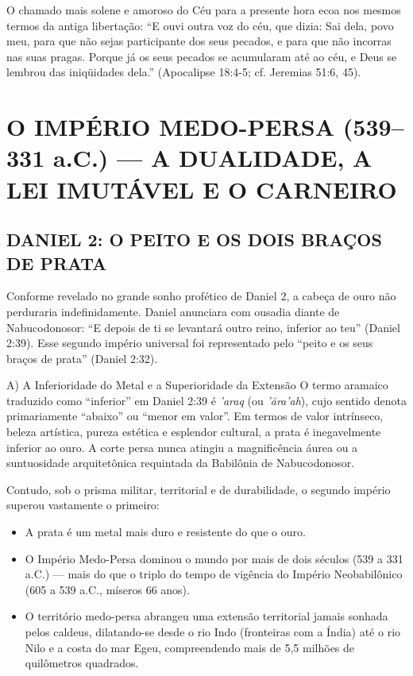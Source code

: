 O chamado mais solene e amoroso do Céu para a presente hora ecoa nos mesmos termos da antiga libertação:
``E ouvi outra voz do céu, que dizia: Sai dela, povo meu, para que não sejas participante dos seus pecados, e para que não incorras nas suas pragas. Porque já os seus pecados se acumularam até ao céu, e Deus se lembrou das iniqüidades dela.'' (Apocalipse 18:4-5; cf. Jeremias 51:6, 45).



\section{O IMPÉRIO MEDO-PERSA (539–331 a.C.) — A DUALIDADE, A LEI IMUTÁVEL E O CARNEIRO}



\subsection{DANIEL 2: O PEITO E OS DOIS BRAÇOS DE PRATA}


Conforme revelado no grande sonho profético de Daniel 2, a cabeça de ouro não perduraria indefinidamente. Daniel anunciara com ousadia diante de Nabucodonosor: ``E depois de ti se levantará outro reino, inferior ao teu'' (Daniel 2:39). Esse segundo império universal foi representado pelo ``peito e os seus braços de prata'' (Daniel 2:32).

A) A Inferioridade do Metal e a Superioridade da Extensão
O termo aramaico traduzido como ``inferior'' em Daniel 2:39 é \textit{'araq} (ou \textit{'ăra'ah}), cujo sentido denota primariamente ``abaixo'' ou ``menor em valor''. Em termos de valor intrínseco, beleza artística, pureza estética e esplendor cultural, a prata é inegavelmente inferior ao ouro. A corte persa nunca atingiu a magnificência áurea ou a suntuosidade arquitetônica requintada da Babilônia de Nabucodonosor.

Contudo, sob o prisma militar, territorial e de durabilidade, o segundo império superou vastamente o primeiro:
\begin{itemize}
  \item A prata é um metal mais duro e resistente do que o ouro.
  \item O Império Medo-Persa dominou o mundo por mais de dois séculos (539 a 331 a.C.) — mais do que o triplo do tempo de vigência do Império Neobabilônico (605 a 539 a.C., míseros 66 anos).
  \item O território medo-persa abrangeu uma extensão territorial jamais sonhada pelos caldeus, dilatando-se desde o rio Indo (fronteiras com a Índia) até o rio Nilo e a costa do mar Egeu, compreendendo mais de 5,5 milhões de quilômetros quadrados.
\end{itemize}


